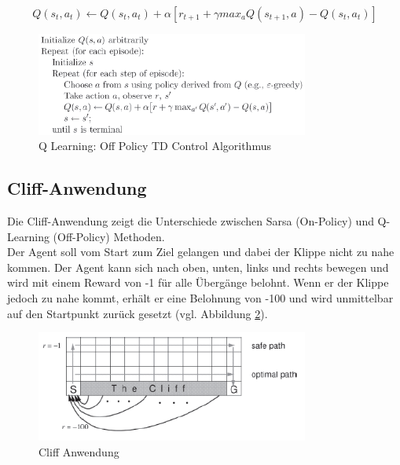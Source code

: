 \documentclass[10pt]{scrartcl}
\begin{document}
\begin{equation}
Q(s_{t},a_{t}) \leftarrow Q(s_{t},a_{t}) + \alpha [r_{t+1} + \gamma max_{a} Q(s_{t+1},a) - Q(s_{t},a_{t})]
\end{equation} 
 
\begin{figure}[htbp]
	\centering	\includegraphics[width=0.8\textwidth]{Bilder/Q-Learning.png}
	\caption{Q Learning: Off Policy TD Control Algorithmus}
	\label{fig:QLearning}
\end{figure}

\subsection{Cliff-Anwendung}
Die Cliff-Anwendung zeigt die Unterschiede zwischen Sarsa (On-Policy) und Q-Learning (Off-Policy) Methoden.\\
Der Agent soll vom Start zum Ziel gelangen und dabei der Klippe nicht zu nahe kommen. Der Agent kann sich nach oben, unten, links und rechts bewegen und wird mit einem Reward von -1 für alle Übergänge belohnt. Wenn er der Klippe jedoch zu nahe kommt, erhält er eine Belohnung von -100 und wird unmittelbar auf den Startpunkt zurück gesetzt (vgl. Abbildung \ref{fig:Cliff}).

\begin{figure}[htbp]
	\centering	\includegraphics[width=0.8\textwidth]{Bilder/Cliff.png}
	\caption{Cliff Anwendung}
	\label{fig:Cliff}
\end{figure}
\end{document}
